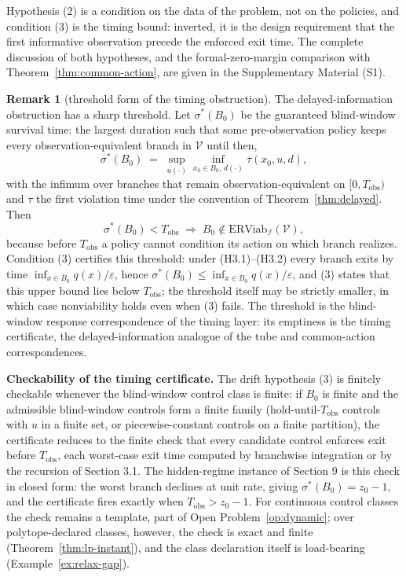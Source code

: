\documentclass[10pt,twocolumn]{article}
\theoremstyle{definition}
\newtheorem{remark}{Remark}
\begin{document}
Hypothesis (2) is a condition on the data of the problem, not on the policies, and condition (3) is the timing bound: inverted, it is the design requirement that the first informative observation precede the enforced exit time. The complete discussion of both hypotheses, and the formal-zero-margin comparison with Theorem~\ref{thm:common-action}, are given in the Supplementary Material (S1).

\begin{remark}[threshold form of the timing obstruction]\label{rem:sigma}
The delayed-information obstruction has a sharp threshold. Let
\(\sigma^*(B_0)\) be the guaranteed blind-window survival time: the
largest duration such that some pre-observation policy keeps every
observation-equivalent branch in \(\mathcal{V}\) until then,
\[\sigma^*(B_0) \;=\; \sup_{u(\cdot)} \inf_{x_0\in B_0,\, d(\cdot)} \tau(x_0,u,d),\]
with the infimum over branches that remain observation-equivalent on
\([0,T_{\mathrm{obs}})\) and \(\tau\) the first violation time under the
convention of Theorem~\ref{thm:delayed}. Then
\[\sigma^*(B_0) < T_{\mathrm{obs}} \;\Longrightarrow\; B_0 \notin \mathrm{ERViab}_{\mathcal{I}}(\mathcal{V}),\]
because before \(T_{\mathrm{obs}}\) a policy cannot condition its action
on which branch realizes. Condition (3) certifies this threshold: under
(H3.1)--(H3.2) every branch exits by time
\(\inf_{x\in B_0}q(x)/\varepsilon\), hence
\(\sigma^*(B_0)\le\inf_{x\in B_0}q(x)/\varepsilon\), and (3) states that
this upper bound lies below \(T_{\mathrm{obs}}\); the threshold itself
may be strictly smaller, in which case nonviability holds even when (3)
fails. The threshold is the blind-window response correspondence of the
timing layer: its emptiness is the timing certificate, the
delayed-information analogue of the tube and common-action
correspondences.
\end{remark}

\textbf{Checkability of the timing certificate.} The drift hypothesis (3) is finitely checkable whenever the blind-window control class is finite: if \(B_{0}\) is finite and the admissible blind-window controls form a finite family (hold-until-\(T_{\mathrm{obs}}\) controls with \(u\) in a finite set, or piecewise-constant controls on a finite partition), the certificate reduces to the finite check that every candidate control enforces exit before \(T_{\mathrm{obs}}\), each worst-case exit time computed by branchwise integration or by the recursion of Section 3.1. The hidden-regime instance of Section 9 is this check in closed form: the worst branch declines at unit rate, giving \(\sigma^{*}(B_{0}) = z_{0} - 1\), and the certificate fires exactly when \(T_{\mathrm{obs}} > z_{0} - 1\). For continuous control classes the check remains a template, part of
Open Problem~\ref{op:dynamic}; over polytope-declared classes, however, the
check is exact and finite (Theorem~\ref{thm:lp-instant}), and the class
declaration itself is load-bearing (Example~\ref{ex:relax-gap}).
\end{document}
